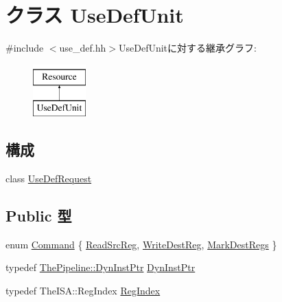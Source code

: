 \hypertarget{classUseDefUnit}{
\section{クラス UseDefUnit}
\label{classUseDefUnit}
}


{\ttfamily \#include $<$use\_\-def.hh$>$}UseDefUnitに対する継承グラフ:\begin{figure}[H]
\begin{center}
\leavevmode
\includegraphics[height=2cm]{classUseDefUnit}
\end{center}
\end{figure}
\subsection*{構成}
\begin{DoxyCompactItemize}
\item 
class \hyperlink{classUseDefUnit_1_1UseDefRequest}{UseDefRequest}
\end{DoxyCompactItemize}
\subsection*{Public 型}
\begin{DoxyCompactItemize}
\item 
enum \hyperlink{classUseDefUnit_a2afce0a47a93eee73a314d53e4890153}{Command} \{ \hyperlink{classUseDefUnit_a2afce0a47a93eee73a314d53e4890153aaeedb0d901f76a332eff9fb2fdb42eee}{ReadSrcReg}, 
\hyperlink{classUseDefUnit_a2afce0a47a93eee73a314d53e4890153aebf3627ab0dc50391abb37f1d20bc375}{WriteDestReg}, 
\hyperlink{classUseDefUnit_a2afce0a47a93eee73a314d53e4890153aa7a98b5cc14566eda10b7248440cafa2}{MarkDestRegs}
 \}
\item 
typedef \hyperlink{classRefCountingPtr}{ThePipeline::DynInstPtr} \hyperlink{classUseDefUnit_af9d0c8a46736ba6aa2d8bb94da1a5e73}{DynInstPtr}
\item 
typedef TheISA::RegIndex \hyperlink{classUseDefUnit_a36d25e03e43fa3bb4c5482cbefe5e0fb}{RegIndex}
\end{DoxyCompactItemize}
